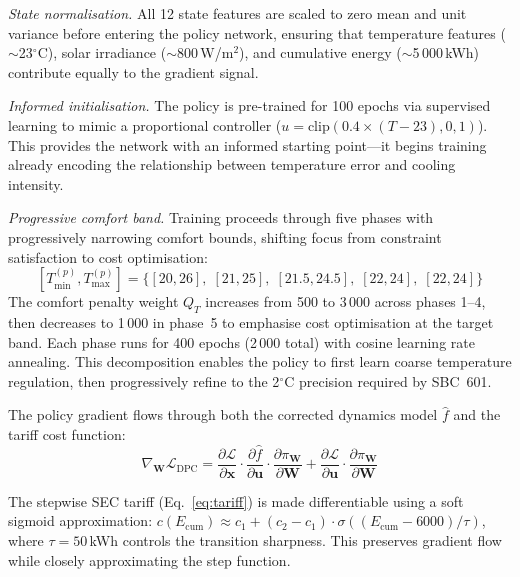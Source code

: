\documentclass[12pt]{article}
\theoremstyle{plain}
\theoremstyle{definition}
\begin{document}
\emph{State normalisation.} All 12 state features are scaled to zero mean and unit variance before entering the policy network, ensuring that temperature features ($\sim$23$^\circ$C), solar irradiance ($\sim$800\,W/m$^2$), and cumulative energy ($\sim$5\,000\,kWh) contribute equally to the gradient signal.

\emph{Informed initialisation.} The policy is pre-trained for 100 epochs via supervised learning to mimic a proportional controller ($u = \text{clip}(0.4 \times (T - 23), 0, 1)$). This provides the network with an informed starting point---it begins training already encoding the relationship between temperature error and cooling intensity.

\emph{Progressive comfort band.} Training proceeds through five phases with progressively narrowing comfort bounds, shifting focus from constraint satisfaction to cost optimisation:
\begin{equation}\label{eq:curriculum}
[T_{\min}^{(p)}, T_{\max}^{(p)}] = \{[20,26],\; [21,25],\; [21.5,24.5],\; [22,24],\; [22,24]\}
\end{equation}
The comfort penalty weight $Q_T$ increases from 500 to 3\,000 across phases 1--4, then decreases to 1\,000 in phase~5 to emphasise cost optimisation at the target band. Each phase runs for 400 epochs (2\,000 total) with cosine learning rate annealing. This decomposition enables the policy to first learn coarse temperature regulation, then progressively refine to the 2$^\circ$C precision required by SBC~601.

The policy gradient flows through both the corrected dynamics model $\hat{f}$ and the tariff cost function:
\begin{equation}
\nabla_{\mathbf{W}} \mathcal{L}_{\text{DPC}} = \frac{\partial \mathcal{L}}{\partial \mathbf{x}} \cdot \frac{\partial \hat{f}}{\partial \mathbf{u}} \cdot \frac{\partial \pi_{\mathbf{W}}}{\partial \mathbf{W}} + \frac{\partial \mathcal{L}}{\partial \mathbf{u}} \cdot \frac{\partial \pi_{\mathbf{W}}}{\partial \mathbf{W}}
\end{equation}

The stepwise SEC tariff (Eq.~\ref{eq:tariff}) is made differentiable using a soft sigmoid approximation: $c(E_{\text{cum}}) \approx c_1 + (c_2 - c_1) \cdot \sigma\!\left((E_{\text{cum}} - 6000) / \tau\right)$, where $\tau = 50$\,kWh controls the transition sharpness. This preserves gradient flow while closely approximating the step function.
\end{document}

